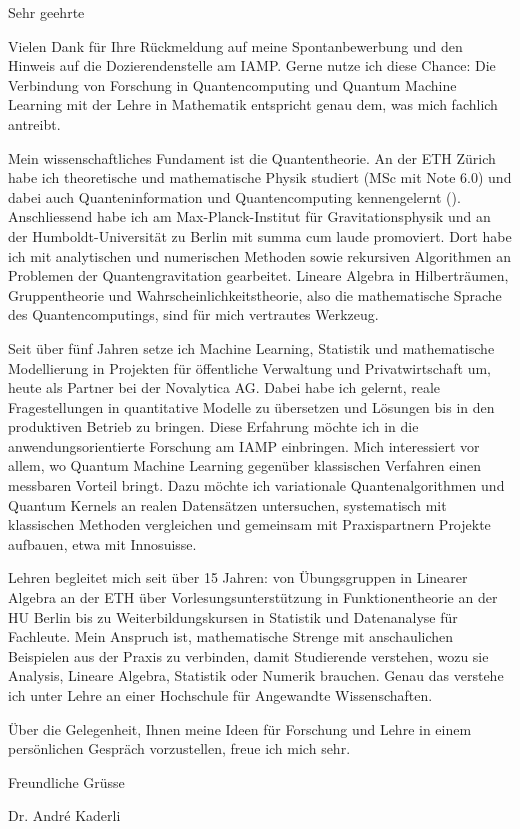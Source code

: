 \documentclass{cv}
\begin{document}
	\begin{letterbody}
	Sehr geehrte

	Vielen Dank für Ihre Rückmeldung auf meine Spontanbewerbung und den Hinweis auf die Dozierendenstelle am IAMP. Gerne nutze ich diese Chance: Die Verbindung von Forschung in Quantencomputing und Quantum Machine Learning mit der Lehre in Mathematik entspricht genau dem, was mich fachlich antreibt.

	Mein wissenschaftliches Fundament ist die Quantentheorie. An der ETH Zürich habe ich theoretische und mathematische Physik studiert (MSc mit Note 6.0) und dabei auch Quanteninformation und Quantencomputing kennengelernt (). Anschliessend habe ich am Max-Planck-Institut für Gravitationsphysik und an der Humboldt-Universität zu Berlin mit summa cum laude promoviert. Dort habe ich mit analytischen und numerischen Methoden sowie rekursiven Algorithmen an Problemen der Quantengravitation gearbeitet. Lineare Algebra in Hilberträumen, Gruppentheorie und Wahrscheinlichkeitstheorie, also die mathematische Sprache des Quantencomputings, sind für mich vertrautes Werkzeug.

	Seit über fünf Jahren setze ich Machine Learning, Statistik und mathematische Modellierung in Projekten für öffentliche Verwaltung und Privatwirtschaft um, heute als Partner bei der Novalytica AG. Dabei habe ich gelernt, reale Fragestellungen in quantitative Modelle zu übersetzen und Lösungen bis in den produktiven Betrieb zu bringen. Diese Erfahrung möchte ich in die anwendungsorientierte Forschung am IAMP einbringen. Mich interessiert vor allem, wo Quantum Machine Learning gegenüber klassischen Verfahren einen messbaren Vorteil bringt. Dazu möchte ich variationale Quantenalgorithmen und Quantum Kernels an realen Datensätzen untersuchen, systematisch mit klassischen Methoden vergleichen und gemeinsam mit Praxispartnern Projekte aufbauen, etwa mit Innosuisse.

	Lehren begleitet mich seit über 15 Jahren: von Übungsgruppen in Linearer Algebra an der ETH über Vorlesungsunterstützung in Funktionentheorie an der HU Berlin bis zu Weiterbildungskursen in Statistik und Datenanalyse für Fachleute. Mein Anspruch ist, mathematische Strenge mit anschaulichen Beispielen aus der Praxis zu verbinden, damit Studierende verstehen, wozu sie Analysis, Lineare Algebra, Statistik oder Numerik brauchen. Genau das verstehe ich unter Lehre an einer Hochschule für Angewandte Wissenschaften.

	Über die Gelegenheit, Ihnen meine Ideen für Forschung und Lehre in einem persönlichen Gespräch vorzustellen, freue ich mich sehr. 
	\end{letterbody}

	\closing{Freundliche Grüsse}{Dr. André Kaderli}

\end{document}
